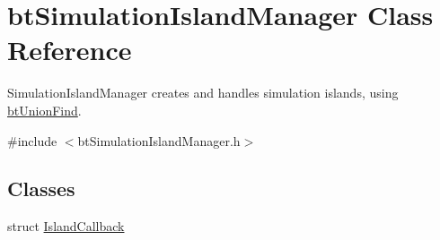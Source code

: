 \hypertarget{classbt_simulation_island_manager}{\section{bt\+Simulation\+Island\+Manager Class Reference}
\label{classbt_simulation_island_manager}
}


Simulation\+Island\+Manager creates and handles simulation islands, using \hyperlink{classbt_union_find}{bt\+Union\+Find}.  




{\ttfamily \#include $<$bt\+Simulation\+Island\+Manager.\+h$>$}

\subsection*{Classes}
\begin{DoxyCompactItemize}
\item 
struct \hyperlink{structbt_simulation_island_manager_1_1_island_callback}{Island\+Callback}
\end{DoxyCompactItemize}
